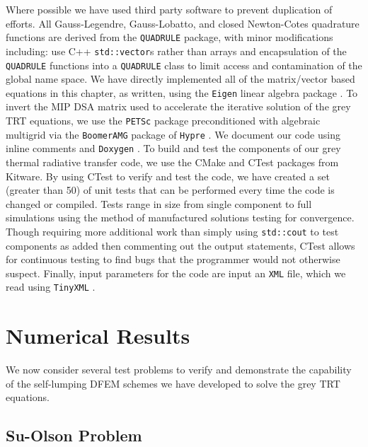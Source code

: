 Where possible we have used third party software to prevent duplication of  efforts.
All Gauss-Legendre, Gauss-Lobatto, and closed Newton-Cotes quadrature functions are derived from the \verb+QUADRULE+ \cite{quadrule} package, with minor modifications including: use C++ \verb+std::vector+s rather than arrays and encapsulation of the \verb+QUADRULE+ functions into a \verb+QUADRULE+ class to limit access and contamination of the global name space.
We have directly implemented all of the matrix/vector based equations in this chapter, as written, using the \verb+Eigen+ linear algebra package \cite{eigen}.
To invert the MIP DSA matrix used to accelerate the iterative solution of the grey TRT equations, we use the \verb+PETSc+ package\cite{petsc} preconditioned with algebraic multigrid\cite{mip_mc} via the \verb+BoomerAMG+ package of \verb+Hypre+ \cite{hypre}.
We document our code using  inline comments  and \verb+Doxygen+ \cite{doxygen}.
To build and test the components of our grey thermal radiative transfer code, we use the CMake and CTest packages from Kitware\cite{cmake}.
By using CTest to verify and test the code, we have created a set (greater than 50) of unit tests that can be performed every time the code is changed or compiled.
Tests range in size from single component to full simulations using the method of manufactured solutions\cite{mms} testing for convergence.
Though requiring more additional work than simply using \verb+std::cout+ to test components as added then commenting out the output statements, CTest allows for continuous testing to find bugs that the programmer would not otherwise suspect.
Finally, input parameters for the code are input an \verb+XML+ file, which we read using \verb+TinyXML+ \cite{xml}. 

\section{Numerical Results}
\label{sec:chap6_results}

We now consider several test problems to verify and demonstrate the capability of the self-lumping DFEM schemes we have developed to solve the grey TRT equations.

\subsection{Su-Olson Problem}

